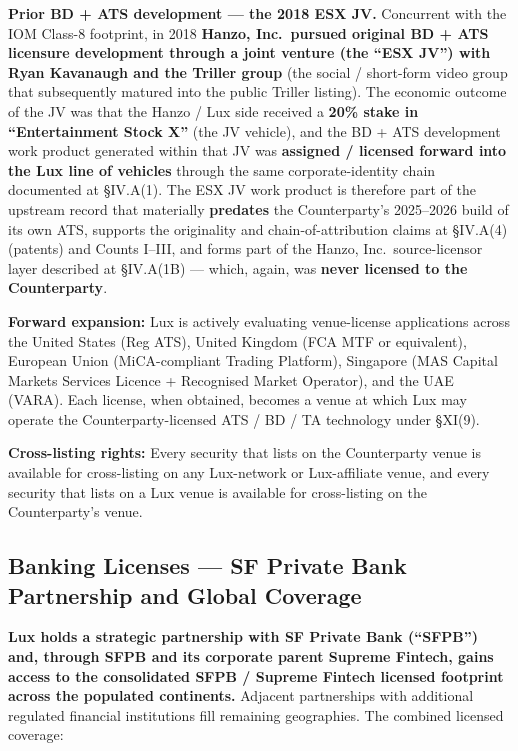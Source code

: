\documentclass[11pt,letterpaper]{article}
\begin{document}
\textbf{Prior BD + ATS development --- the 2018 ESX JV.}
Concurrent with the IOM Class-8 footprint, in 2018 \textbf{Hanzo,
Inc.\ pursued original BD + ATS licensure development through a
joint venture (the ``ESX JV'') with Ryan Kavanaugh and the Triller
group} (the social / short-form video group that subsequently
matured into the public Triller listing). The economic outcome of
the JV was that the Hanzo / Lux side received a \textbf{20\% stake
in ``Entertainment Stock X''} (the JV vehicle), and the BD + ATS
development work product generated within that JV was
\textbf{assigned / licensed forward into the Lux line of vehicles}
through the same corporate-identity chain documented at \S IV.A(1).
The ESX JV work product is therefore part of the upstream record
that materially \textbf{predates} the Counterparty's 2025--2026
build of its own ATS, supports the originality and
chain-of-attribution claims at \S IV.A(4) (patents) and Counts
I--III, and forms part of the Hanzo, Inc.\ source-licensor layer
described at \S IV.A(1B) --- which, again, was \textbf{never
licensed to the Counterparty}.

\textbf{Forward expansion:} Lux is actively evaluating venue-license
applications across the United States (Reg ATS), United Kingdom
(FCA MTF or equivalent), European Union (MiCA-compliant Trading
Platform), Singapore (MAS Capital Markets Services Licence +
Recognised Market Operator), and the UAE (VARA). Each license,
when obtained, becomes a venue at which Lux may operate the
Counterparty-licensed ATS / BD / TA technology under \S XI(9).

\textbf{Cross-listing rights:} Every security that lists on the
Counterparty venue is available for cross-listing on any Lux-network
or Lux-affiliate venue, and every security that lists on a Lux
venue is available for cross-listing on the Counterparty's venue.

\subsection*{Banking Licenses --- SF Private Bank Partnership and Global Coverage}

\textbf{Lux holds a strategic partnership with SF Private Bank
(``SFPB'') and, through SFPB and its corporate parent
\textbf{Supreme Fintech}, gains access to the consolidated SFPB /
Supreme Fintech licensed footprint across the populated continents.}
Adjacent partnerships with additional regulated financial
institutions fill remaining geographies. The combined licensed
coverage:
\end{document}
